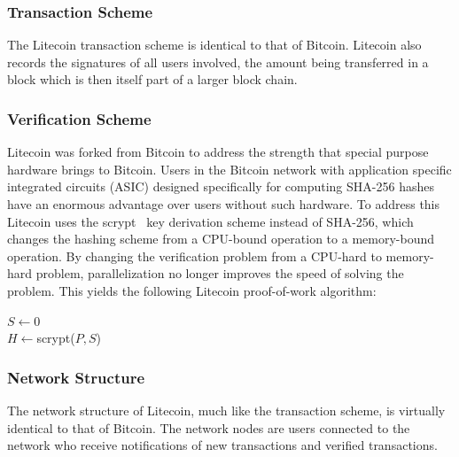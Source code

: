 \documentclass[11pt]{article}
\begin{document}
\subsubsection{Transaction Scheme} The Litecoin transaction scheme is identical to that of Bitcoin. Litecoin also
records the signatures of all users involved, the amount being transferred in a block which is then itself part of a
larger block chain.

\subsubsection{Verification Scheme} Litecoin was forked from Bitcoin to address the strength that special purpose
hardware brings to Bitcoin. Users in the Bitcoin network with application specific integrated circuits (ASIC) designed
specifically for computing SHA-256 hashes have an enormous advantage over users without such hardware. To address this
Litecoin uses the scrypt~\cite{percival09} key derivation scheme instead of SHA-256, which changes the hashing scheme
from a CPU-bound operation to a memory-bound operation. By changing the verification problem from a CPU-hard to
memory-hard problem, parallelization no longer improves the speed of solving the problem. This yields the following
Litecoin proof-of-work algorithm: \begin{algorithm} 
 $S \gets 0$\\ $H \gets ${\sc scrypt($P, S$)}\\   \end{algorithm}

\subsubsection{Network Structure} The network structure of Litecoin, much like the transaction scheme, is virtually
identical to that of Bitcoin. The network nodes are users connected to the network who receive notifications of new
transactions and verified transactions.
\end{document}
